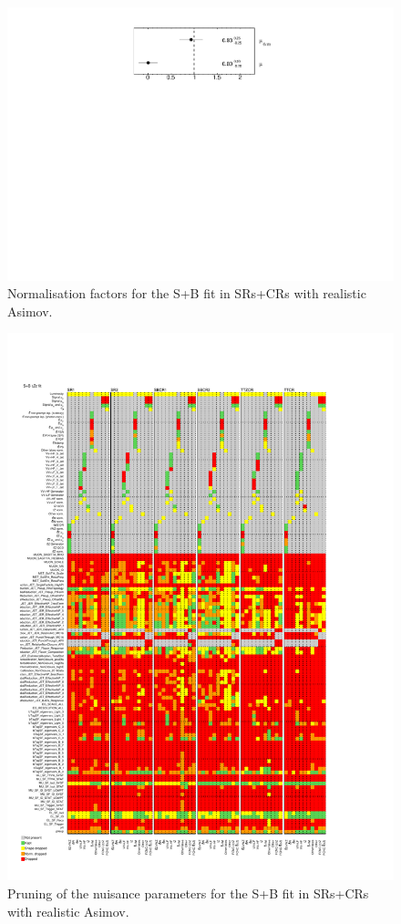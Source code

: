 \begin{figure}[!htbp]
	\centering
	\includegraphics[width=.4\textwidth]{Appendices/AP9/figures/SPLUSB_CRSR_UsingBaseFullSys/NormFactors}
	\caption{Normalisation factors for the S+B \tZc fit in SRs+CRs with realistic Asimov.}%
	\label{fig:stat:tzc:splusb:crsr:norm_base}
\end{figure}
\restoregeometry

\begin{figure}[htbp]
	\centering
	\includegraphics[width=.85\textwidth]{Appendices/AP9/figures/SPLUSB_CRSR_UsingBaseFullSys/Pruning}
	\caption{Pruning of the nuisance parameters for the S+B fit in SRs+CRs with realistic Asimov.}%
	\label{fig:stat:tzc:splusb:crsr:pruning_base}
\end{figure}

